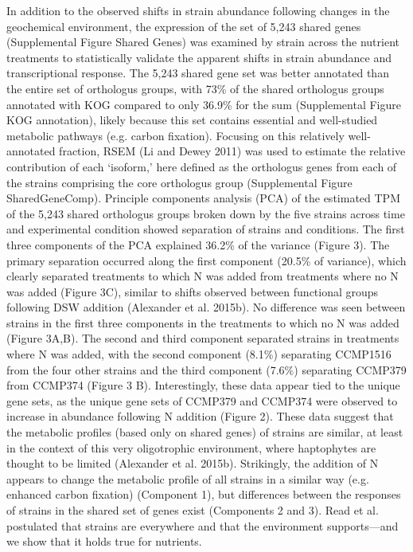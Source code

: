 In addition to the observed shifts in strain abundance following changes in the geochemical environment, the expression of the set of 5,243 shared genes (Supplemental Figure Shared Genes) was examined by strain across the nutrient treatments to statistically validate the apparent shifts in strain abundance and transcriptional response. The 5,243 shared gene set was better annotated than the entire set of orthologus groups, with 73\% of the shared orthologus groups annotated with KOG compared to only 36.9\% for the sum (Supplemental Figure KOG annotation), likely because this set contains essential and well-studied metabolic pathways (e.g. carbon fixation). Focusing on this relatively well-annotated fraction, RSEM (Li and Dewey 2011) was used to estimate the relative contribution of each ‘isoform,’ here defined as the orthologus genes from each of the strains comprising the core orthologus group (Supplemental Figure SharedGeneComp). Principle components analysis (PCA) of the estimated TPM of the 5,243 shared orthologus groups broken down by the five strains across time and experimental condition showed separation of strains and conditions. The first three components of the PCA explained 36.2\% of the variance (Figure 3). The primary separation occurred along the first component (20.5\% of variance), which clearly separated treatments to which N was added from treatments where no N was added (Figure 3C), similar to shifts observed between functional groups following DSW addition (Alexander et al. 2015b). No difference was seen between strains in the first three components in the treatments to which no N was added (Figure 3A,B). The second and third component separated strains in treatments where N was added, with the second component (8.1\%) separating CCMP1516 from the four other strains and the third component (7.6\%) separating CCMP379 from CCMP374 (Figure 3 B). Interestingly, these data appear tied to the unique gene sets, as the unique gene sets of CCMP379 and CCMP374 were observed to increase in abundance following N addition (Figure 2). These data suggest that the metabolic profiles (based only on shared genes) of strains are similar, at least in the context of this very oligotrophic environment, where haptophytes are thought to be limited (Alexander et al. 2015b). Strikingly, the addition of N appears to change the metabolic profile of all strains in a similar way (e.g. enhanced carbon fixation) (Component 1), but differences between the responses of strains in the shared set of genes exist (Components 2 and 3). 
Read et al. postulated that strains are everywhere and that the environment supports—and we show that it holds true for nutrients. 
